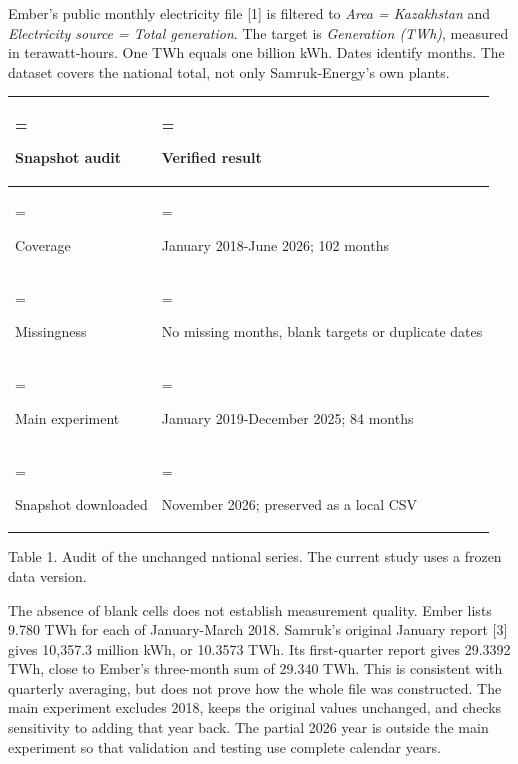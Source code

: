 \documentclass[11pt,a4paper]{article}
\begin{document}
\par{}\par\vspace{2pt}

Ember's public monthly electricity file [1] is filtered to \textit{Area = Kazakhstan} and \textit{Electricity source = Total generation}. The target is \textit{Generation (TWh)}, measured in terawatt-hours. One TWh equals one billion kWh. Dates identify months. The dataset covers the national total, not only Samruk-Energy's own plants.\par

{\fontsize{9.2}{11.3}\selectfont\begin{tabularx}{\linewidth}{@{}>{\hsize=0.64000\hsize\linewidth=\hsize\raggedright\arraybackslash}X>{\hsize=1.36000\hsize\linewidth=\hsize\raggedright\arraybackslash}X@{}}\toprule

\rowcolor[gray]{0.94}

Snapshot audit & Verified result \\

\midrule

Coverage & January 2018-June 2026; 102 months \\

Missingness & No missing months, blank targets or duplicate dates \\

Main experiment & January 2019-December 2025; 84 months \\

Snapshot downloaded & 18 November 2026; preserved as a local CSV \\

\bottomrule\end{tabularx}}\par

{\fontsize{9}{11.3}\selectfont Table 1. Audit of the unchanged national series. The current study uses a frozen data version.\par}

\clearpage

\par{}\par\vspace{2pt}

The absence of blank cells does not establish measurement quality. Ember lists 9.780 TWh for each of January-March 2018. Samruk's original January report [3] gives 10,357.3 million kWh, or 10.3573 TWh. Its first-quarter report gives 29.3392 TWh, close to Ember's three-month sum of 29.340 TWh. This is consistent with quarterly averaging, but does not prove how the whole file was constructed. The main experiment excludes 2018, keeps the original values unchanged, and checks sensitivity to adding that year back. The partial 2026 year is outside the main experiment so that validation and testing use complete calendar years.\par
\end{document}
